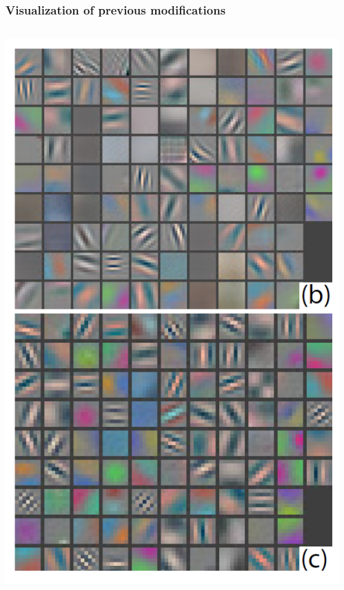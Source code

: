 \begin{frame}
	\frametitle{Visualization of previous modifications}

		\begin{columns} %
		\begin{column}{.6\textwidth}
			\begin{center}
			\includegraphics[scale=0.6]{figs/vizualization_cnn}
		\end{center}
		\end{column}%



		\begin{column}{.4\textwidth}


\end{column}
\end{columns}
\end{frame}

